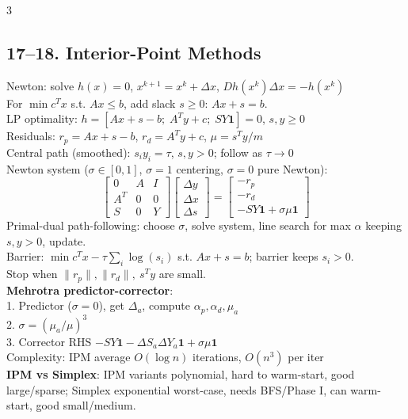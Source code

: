 \documentclass[8pt,landscape]{extarticle}
\newcommand{\1}{\mathbf{1}}
\newcommand{\0}{\mathbf{0}}
\begin{document}
\begin{multicols*}{3}
\subsection*{17--18. Interior-Point Methods}
Newton: solve $h(x)=0$, $x^{k+1}=x^k+\Delta x$, $Dh(x^k)\Delta x=-h(x^k)$ \\
For $\min c^Tx$ s.t. $Ax\le b$, add slack $s\ge0$: $Ax+s=b$. \\
LP optimality: $h=[Ax+s-b;\; A^Ty+c;\; SY\1]=0$, $s,y\ge0$ \\
Residuals: $r_p=Ax+s-b$, $r_d=A^Ty+c$, $\mu=s^Ty/m$ \\
Central path (smoothed): $s_iy_i=\tau$, $s,y>0$; follow as $\tau\to0$ \\
Newton system ($\sigma\in[0,1]$, $\sigma=1$ centering, $\sigma=0$ pure Newton):
\[
\begin{bmatrix}0&A&I\\ A^T&0&0\\ S&0&Y\end{bmatrix}
\begin{bmatrix}\Delta y\\\Delta x\\\Delta s\end{bmatrix}
= \begin{bmatrix}-r_p\\-r_d\\-SY\1+\sigma\mu\1\end{bmatrix}
\]
Primal-dual path-following: choose $\sigma$, solve system, line search for max $\alpha$ keeping $s,y>0$, update. \\
Barrier: $\min c^Tx-\tau\sum_i\log(s_i)$ s.t. $Ax+s=b$; barrier keeps $s_i>0$. \\
Stop when $\|r_p\|,\|r_d\|,\ s^Ty$ are small. \\
\textbf{Mehrotra predictor-corrector}: \\
1. Predictor ($\sigma=0$), get $\Delta_a$, compute $\alpha_p,\alpha_d,\mu_a$ \\
2. $\sigma = (\mu_a/\mu)^3$ \\
3. Corrector RHS $-SY\1 - \Delta S_a\Delta Y_a\1 + \sigma\mu\1$ \\
Complexity: IPM average $O(\log n)$ iterations, $O(n^3)$ per iter \\
\textbf{IPM vs Simplex}: IPM variants polynomial, hard to warm-start, good large/sparse; Simplex exponential worst-case, needs BFS/Phase I, can warm-start, good small/medium.



\end{multicols*}
\end{document}
